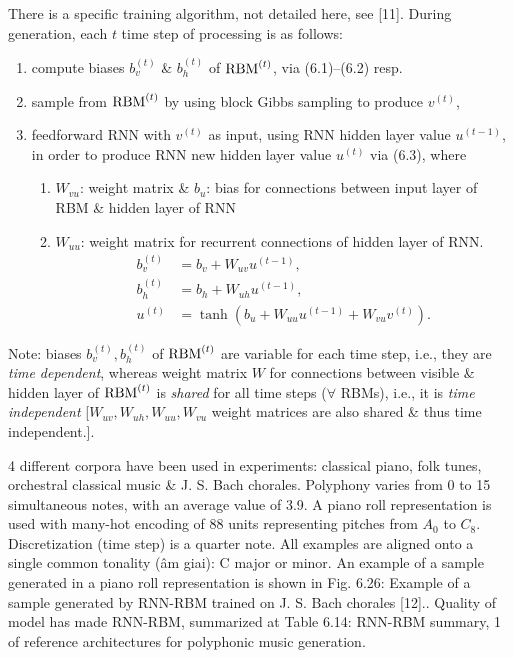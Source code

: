 \documentclass{article}
\begin{document}
\begin{itemize}
\begin{itemize}
\begin{itemize}
\begin{itemize}
\begin{enumerate}
				\end{enumerate}
				There is a specific training algorithm, not detailed here, see [11]. During generation, each $t$ time step of processing is as follows:
				\begin{enumerate}
					\item compute biases $b_v^{(t)}$ \& $b_h^{(t)}$ of ${\rm RBM}^{(t)}$, via (6.1)--(6.2) resp.
					\item sample from ${\rm RBM}^{(t)}$ by using block Gibbs sampling to produce $v^{(t)}$,
					\item feedforward RNN with $v^{(t)}$ as input, using RNN hidden layer value $u^{(t-1)}$, in order to produce RNN new hidden layer value $u^{(t)}$ via (6.3), where
					\begin{enumerate}
						\item $W_{vu}$: weight matrix \& $b_u$: bias for connections between input layer of RBM \& hidden layer of RNN
						\item $W_{uu}$: weight matrix for recurrent connections of hidden layer of RNN.
						\begin{align*}
							b_v^{(t)} &= b_v + W_{uv}u^{(t-1)},\\
							b_h^{(t)} &= b_h + W_{uh}u^{(t-1)},\\
							u^{(t)} &= \tanh(b_u + W_{uu}u^{(t-1)} + W_{vu}v^{(t)}).
						\end{align*}
					\end{enumerate}
				\end{enumerate}
				Note: biases $b_v^{(t)},b_h^{(t)}$ of ${\rm RBM}^{(t)}$ are variable for each time step, i.e., they are {\it time dependent}, whereas weight matrix $W$ for connections between visible \& hidden layer of ${\rm RBM}^{(t)}$ is {\it shared} for all time steps ($\forall$ RBMs), i.e., it is {\it time independent} [$W_{uv},W_{uh},W_{uu},W_{vu}$ weight matrices are also shared \& thus time independent.].
				
				4 different corpora have been used in experiments: classical piano, folk tunes, orchestral classical music \& {\sc J. S. Bach} chorales. Polyphony varies from 0 to 15 simultaneous notes, with an average value of 3.9. A piano roll representation is used with many-hot encoding of 88 units representing pitches from $A_0$ to $C_8$. Discretization (time step) is a quarter note. All examples are aligned onto a single common tonality (âm giai): C major or minor. An example of a sample generated in a piano roll representation is shown in {\sf Fig. 6.26: Example of a sample generated by RNN-RBM trained on {\sc J. S. Bach} chorales [12].}. Quality of model has made RNN-RBM, summarized at {\sf Table 6.14: RNN-RBM summary}, 1 of reference architectures for polyphonic music generation.
				

\end{itemize}
\end{itemize}
\end{itemize}
\end{itemize}
\end{document}
